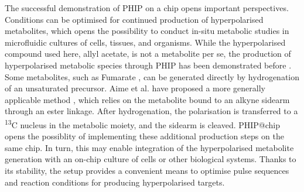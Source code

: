 The successful demonstration of PHIP on a chip opens important perspectives.
Conditions can be optimised for continued production of hyperpolarised metabolites,
which opens the possibility to conduct in-situ metabolic studies in microfluidic
cultures of cells, tissues, and organisms.
While the hyperpolarised compound used here, allyl acetate, is not
a metabolite per se, the production of hyperpolarised metabolic species
through PHIP has been demonstrated before \cite{cavallari201813,shchepin2014parahydrogen,reineri2015parahydrogen,Ripka:2018dc,Korchak:2018ga,Hovener:2018cg}.
Some metabolites, such as Fumarate \cite{Ripka:2018dc}, can be
 generated directly by hydrogenation
of an unsaturated precursor. Aime et al. have proposed a more generally
applicable method \cite{reineri2015parahydrogen}, which relies on the metabolite bound to an alkyne sidearm
through an ester linkage. After hydrogenation, the polarisation is  transferred to a
 \textsuperscript{13}C nucleus in the metabolic moiety, and the sidearm is
 cleaved. PHIP@chip opens the possiblity of implementing these additional
production steps on the same chip. In turn, this may enable integration
of the hyperpolarised metabolite generation with an on-chip culture
of cells or other biological systems.
Thanks to its stability,
the setup provides a convenient means to optimise pulse sequences
and reaction conditions for producing hyperpolarised targets.
